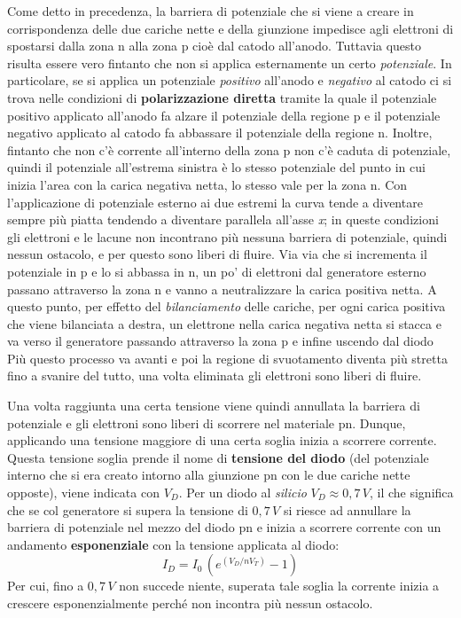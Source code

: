 \documentclass[12pt, a4paper]{report}
\begin{document}
Come detto in precedenza, la barriera di potenziale che si viene a creare in corrispondenza delle due cariche nette e della giunzione impedisce agli elettroni di spostarsi dalla zona n alla zona p cioè dal catodo all'anodo. Tuttavia questo risulta essere vero fintanto che non si applica esternamente un certo \textit{potenziale}. In particolare, se si applica un potenziale \textit{positivo} all'anodo e \textit{negativo} al catodo ci si trova nelle condizioni di \textbf{polarizzazione diretta} tramite la quale il potenziale positivo applicato all'anodo fa alzare il potenziale della regione p e il potenziale negativo applicato al catodo fa abbassare il potenziale della regione n. Inoltre, fintanto che non c'è corrente all'interno della zona p non c'è caduta di potenziale, quindi il potenziale all'estrema sinistra è lo stesso potenziale del punto in cui inizia l'area con la carica negativa netta, lo stesso vale per la zona n. Con l'applicazione di potenziale esterno ai due estremi la curva tende a diventare sempre più piatta tendendo a diventare parallela all'asse \textit{x}; in queste condizioni gli elettroni e le lacune non incontrano più nessuna barriera di potenziale, quindi nessun ostacolo, e per questo sono liberi di fluire. Via via che si incrementa il potenziale in p e lo si abbassa in n, un po' di elettroni dal generatore esterno passano attraverso la zona n e vanno a neutralizzare la carica positiva netta. A questo punto, per effetto del \textit{bilanciamento} delle cariche, per ogni carica positiva che viene bilanciata a destra, un elettrone nella carica negativa netta si stacca e va verso il generatore passando attraverso la zona p e infine uscendo dal diodo Più questo processo va avanti e poi la regione di svuotamento diventa più stretta fino a svanire del tutto, una volta eliminata gli elettroni sono liberi di fluire.

Una volta raggiunta una certa tensione viene quindi annullata la barriera di potenziale e gli elettroni sono liberi di scorrere nel materiale pn. Dunque, applicando una tensione maggiore di una certa soglia inizia a scorrere corrente. Questa tensione soglia prende il nome di \textbf{tensione del diodo} (del potenziale interno che si era creato intorno alla giunzione pn con le due cariche nette opposte), viene indicata con $V_{D}$. Per un diodo al \textit{silicio} $V_D \approx 0,7\,V$, il che significa che se col generatore si supera la tensione di $0,7\,V$ si riesce ad annullare la barriera di potenziale nel mezzo del diodo pn e inizia a scorrere corrente con un andamento \textbf{esponenziale} con la tensione applicata al diodo:
\begin{equation}
    I_{D} = I_{0}\,(e^{(V_{D}/nV_{T})} - 1)
    \label{corrente_id}
\end{equation}
Per cui, fino a $0,7\,V$ non succede niente, superata tale soglia la corrente inizia a crescere esponenzialmente perché non incontra più nessun ostacolo.
\end{document}
